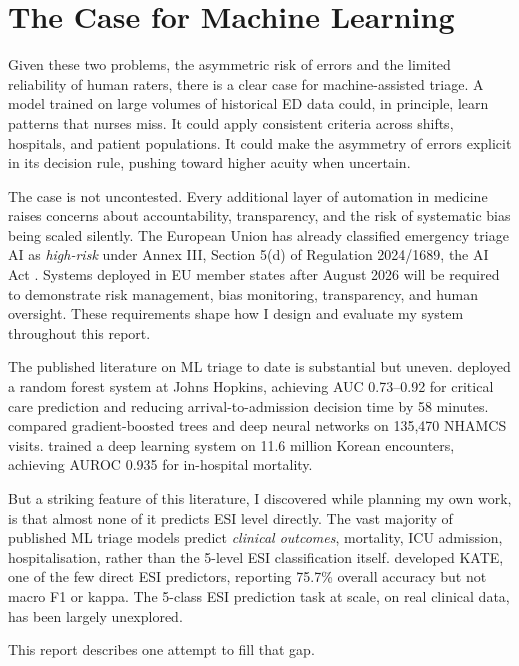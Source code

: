 \section{The Case for Machine Learning}

Given these two problems, the asymmetric risk of errors and the limited reliability of human raters, there is a clear case for machine-assisted triage. A model trained on large volumes of historical ED data could, in principle, learn patterns that nurses miss. It could apply consistent criteria across shifts, hospitals, and patient populations. It could make the asymmetry of errors explicit in its decision rule, pushing toward higher acuity when uncertain.

The case is not uncontested. Every additional layer of automation in medicine raises concerns about accountability, transparency, and the risk of systematic bias being scaled silently. The European Union has already classified emergency triage AI as \emph{high-risk} under Annex III, Section 5(d) of Regulation 2024/1689, the AI Act \citep{eu2024aiact}. Systems deployed in EU member states after August 2026 will be required to demonstrate risk management, bias monitoring, transparency, and human oversight. These requirements shape how I design and evaluate my system throughout this report.

The published literature on ML triage to date is substantial but uneven. \citet{levin2018machine} deployed a random forest system at Johns Hopkins, achieving AUC 0.73--0.92 for critical care prediction and reducing arrival-to-admission decision time by 58 minutes. \citet{raita2019emergency} compared gradient-boosted trees and deep neural networks on 135,470 NHAMCS visits. \citet{kwon2018deep} trained a deep learning system on 11.6 million Korean encounters, achieving AUROC 0.935 for in-hospital mortality.

But a striking feature of this literature, I discovered while planning my own work, is that almost none of it predicts ESI level directly. The vast majority of published ML triage models predict \emph{clinical outcomes}, mortality, ICU admission, hospitalisation, rather than the 5-level ESI classification itself. \citet{ivanov2021kate} developed KATE, one of the few direct ESI predictors, reporting 75.7\% overall accuracy but not macro F1 or kappa. The 5-class ESI prediction task at scale, on real clinical data, has been largely unexplored.

This report describes one attempt to fill that gap.

